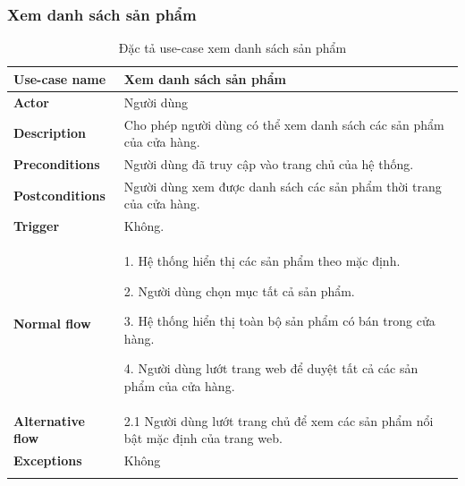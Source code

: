 \subsubsection{Xem danh sách sản phẩm}
\begin{center}
    {
        \setlength\extrarowheight{6pt}
        \begin{longtable}{| p{} | p{} |}
            \hline
            \textbf{Use-case name}
             &
            Xem danh sách sản phẩm
            \\
            \hline
            \textbf{Actor}
             &
            Người dùng
            \\
            \hline
            \textbf{Description}
             &
            Cho phép người dùng có thể xem danh sách các sản phẩm của cửa hàng.
            \\
            \hline
            \textbf{Preconditions}
             &
            Người dùng đã truy cập vào trang chủ của hệ thống.
            \\
            \hline
            \textbf{Postconditions}
             &
            Người dùng xem được danh sách các sản phẩm thời trang của cửa hàng.
            \\
            \hline
            \textbf{Trigger}
             &
            Không.
            \\
            \hline
            \textbf{Normal flow}
             &
            1. Hệ thống hiển thị các sản phẩm theo mặc định.

            2. Người dùng chọn mục tất cả sản phẩm.

            3. Hệ thống hiển thị toàn bộ sản phẩm có bán trong cửa hàng.

            4. Người dùng lướt trang web để duyệt tất cả các sản phẩm của cửa hàng.
            \\
            \hline
            \textbf{Alternative flow}
             &
            2.1 Người dùng lướt trang chủ để xem các sản phẩm nổi bật mặc định của trang web.
            \\
            \hline
            \textbf{Exceptions}
             &
            Không
            \\
            \hline
            \caption{Đặc tả use-case xem danh sách sản phẩm}
        \end{longtable}
    }

\end{center}


